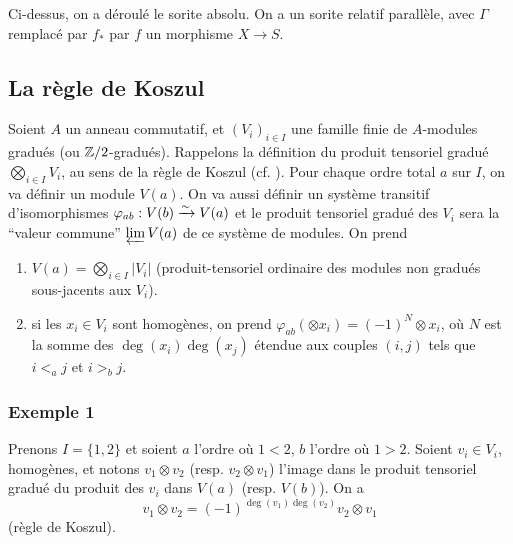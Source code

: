 \subsubsection{}\label{IV:1-2-6}

Ci-dessus, on a d\'eroul\'e le sorite absolu. On a un sorite relatif 
parall\`ele, avec $\Gamma$ remplac\'e par $f_*$ par $f$ un morphisme $X\to S$. 










\subsection{La r\`egle de Koszul}\label{IV:1-3}

Soient $A$ un anneau commutatif, et $(V_i)_{i\in I}$ une famille finie de 
$A$-modules gradu\'es (ou $\mathbb{Z}/2$-gradu\'es). Rappelons la d\'efinition du 
produit tensoriel gradu\'e $\bigotimes_{i\in I} V_i$, au sens de la r\`egle de 
Koszul (cf. \cite[XVII 1.1]{sga4}). Pour chaque ordre total $a$ sur $I$, on va 
d\'efinir un module $V(a)$. On va aussi d\'efinir un syst\`eme transitif 
d'isomorphismes $\varphi_{a b}:V(b)\xrightarrow\sim V(a)$ et le produit tensoriel 
gradu\'e des $V_i$ sera la ``valeur commune'' $\varprojlim V(a)$ de ce 
syst\`eme de modules. On prend 
\begin{enumerate}[\indent a)]
  \item $V(a) = \bigotimes_{i\in I} |V_i|$ (produit-tensoriel ordinaire des 
    modules non gradu\'es sous-jacents aux $V_i$).
  \item si les $x_i\in V_i$ sont homog\`enes, on prend 
    $\varphi_{a b}(\otimes x_i) = (-1)^N \otimes x_i$, o\`u $N$ est la somme 
    des $\deg(x_i)\deg(x_j)$ \'etendue aux couples $(i,j)$ tels que 
    $i<_a j$ et $i>_b j$.
\end{enumerate}





\subsubsection*{Exemple 1}

Prenons $I=\{1,2\}$ et soient $a$ l'ordre o\`u $1<2$, $b$ l'ordre o\`u $1>2$. 
Soient $v_i\in V_i$, homog\`enes, et notons $v_1\otimes v_2$ (resp. 
$v_2\otimes v_1$) l'image dans le produit tensoriel gradu\'e du produit des 
$v_i$ dans $V(a)$ (resp. $V(b)$). On a 
\[
  v_1\otimes v_2 = (-1)^{\deg(v_1)\deg(v_2)} v_2\otimes v_1
\]
(r\`egle de Koszul). 





